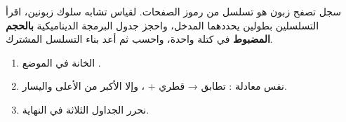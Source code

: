\begin{statement}
سجل تصفح زبون هو تسلسل من رموز الصفحات. لقياس تشابه سلوك زبونين، اقرأ التسلسلين بطولين يحددهما المدخل، واحجز جدول البرمجة الديناميكية \textbf{بالحجم المضبوط}  في كتلة واحدة، واحسب \textbf{} ثم أعد بناء التسلسل المشترك.
\end{statement}
\begin{stepsbox}\begin{enumerate}
\item الخانة  في الموضع .
\item نفس معادلة : تطابق → قطري + ، وإلا الأكبر من الأعلى واليسار.
\item نحرر الجداول الثلاثة في النهاية.
\end{enumerate}\end{stepsbox}
